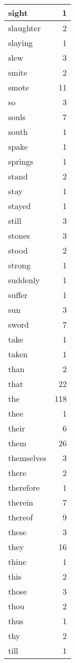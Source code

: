 \begin{center}
\begin{longtable}{l|r}
sight & 1 \\ \hline
slaughter & 2 \\ \hline
slaying & 1 \\ \hline
slew & 3 \\ \hline
smite & 2 \\ \hline
smote & 11 \\ \hline
so & 3 \\ \hline
souls & 7 \\ \hline
south & 1 \\ \hline
spake & 1 \\ \hline
springs & 1 \\ \hline
stand & 2 \\ \hline
stay & 1 \\ \hline
stayed & 1 \\ \hline
still & 3 \\ \hline
stones & 3 \\ \hline
stood & 2 \\ \hline
strong & 1 \\ \hline
suddenly & 1 \\ \hline
suffer & 1 \\ \hline
sun & 3 \\ \hline
sword & 7 \\ \hline
take & 1 \\ \hline
taken & 1 \\ \hline
than & 2 \\ \hline
that & 22 \\ \hline
the & 118 \\ \hline
thee & 1 \\ \hline
their & 6 \\ \hline
them & 26 \\ \hline
themselves & 3 \\ \hline
there & 2 \\ \hline
therefore & 1 \\ \hline
therein & 7 \\ \hline
thereof & 9 \\ \hline
these & 3 \\ \hline
they & 16 \\ \hline
thine & 1 \\ \hline
this & 2 \\ \hline
those & 3 \\ \hline
thou & 2 \\ \hline
thus & 1 \\ \hline
thy & 2 \\ \hline
till & 1 \\ \hline

\end{longtable}
\end{center}
